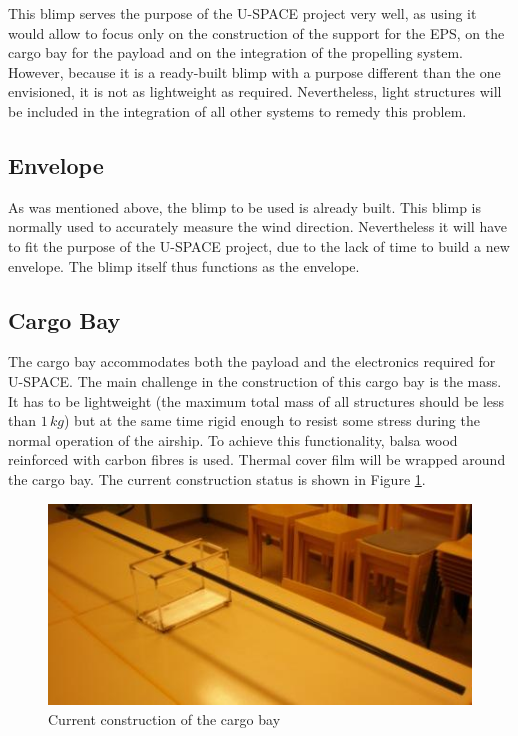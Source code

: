 %
\noindent
This blimp serves the purpose of the U-SPACE project very well, as using it would allow to focus only on the construction of the support for the \ac{EPS}, on the cargo bay for the payload and on the integration of the propelling system. However, because it is a ready-built blimp with a purpose different than the one envisioned, it is not as lightweight as required. Nevertheless, light structures will be included in the integration of all other systems to remedy this problem.
%
\subsection{Envelope}
%
As was mentioned above, the blimp to be used is already built. This blimp is normally used to accurately measure the wind direction. Nevertheless it will have to fit the purpose of the U-SPACE project, due to the lack of time to build a new envelope. The blimp itself thus functions as the envelope.  
%
\subsection{Cargo Bay}
%
The cargo bay accommodates both the payload and the electronics required for \ac{U-SPACE}. The main challenge in the construction of this cargo bay is the mass. It has to be lightweight (the maximum total mass of all structures should be less than $1\,kg$) but at the same time rigid enough to resist some stress during the normal operation of the airship. To achieve this functionality, balsa wood reinforced with carbon fibres is used. Thermal cover film will be wrapped around the cargo bay. The current construction status is shown in Figure \ref{fig:cargo_bay}. 
%
\begin{figure}[H]
\centering
\includegraphics[width=\textwidth]{figures/fig_CDR_MSE_cargo_bay.jpg}
\caption{Current construction of the cargo bay} 
\label{fig:cargo_bay}
\end{figure}
%
%
